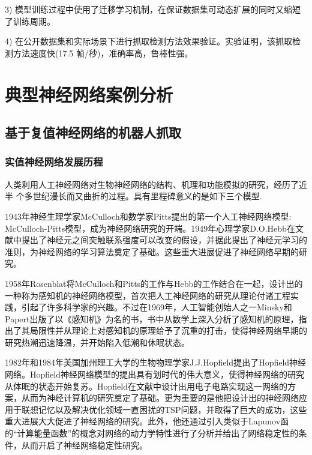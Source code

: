\documentclass[no-math,bwprint]{YangThesis}
\begin{document}
3) 模型训练过程中使用了迁移学习\cite{bibb13}机制，在保证数据集可动态扩展的同时又缩短了训练周期。

4) 在公开数据集和实际场景下进行抓取检测方法效果验证。实验证明，该抓取检测方法速度快(17.5 帧/秒)，准确率高，鲁棒性强。

\newpage
\section{典型神经网络案例分析}

\subsection{基于复值神经网络的机器人抓取}

\subsubsection{实值神经网络发展历程}

人类利用人工神经网络对生物神经网络的结构、机理和功能模拟的研究，经历了近半
个多世纪漫长而又曲折的过程。具有里程碑意义的是如下三个模型\cite{bibc1,bibc2}.

1943年神经生理学家McCulloch和数学家Pitts提出的第一个人工神经网络模型:
McCulloch-Pitts模型\cite{bibc3}，成为神经网络研究的开端。1949年心理学家D.O.Hebb在文献\cite{bibc4}中提出了神经元之间突触联系强度可以改变的假设，并据此提出了神经元学习的准则，为神经网络的学习算法奠定了基础。这些重大进展促进了神经网络早期的研究。

1958年Rosenblat将McCulloch和Pitts的工作与Hebb的工作结合在一起，设计出的
一种称为感知机的神经网络模型\cite{bibc5}，首次把人工神经网络的研究从理论付诸工程实践，引起了许多科学家的兴趣。不过在1969年，人工智能创始人之一Minsky和Papert出版了以《感知机》为名的书\cite{bibc6}，书中从数学上深入分析了感知机的原理，指出了其局限性并从理论上对感知机的原理给予了沉重的打击，使得神经网络早期的研究热潮迅速降温，并开始陷入低潮和休眠状态。

1982年和1984年美国加州理工大学的生物物理学家J.J.Hopfield提出了Hopfield神经
网络\cite{bibc7,bibc8}。Hopfield神经网络模型的提出具有划时代的伟大意义，使得神经网络的研究从体眠的状态开始复苏。Hopfield在文献\cite{bibc7,bibc8}中设计出用电子电路实现这一网络的方案，从而为神经计算机的研究奠定了基础。更为重要的是他把设计出的神经网络应用于联想记忆以及解决优化领域一直困扰的TSP问题，并取得了巨大的成功，这些重大进展大大促进了神经网络的研究。此外，他还通过引入类似于Lapunov函的“计算能量函数”的概念对网络的动力学特性进行了分析并给出了网络稳定性的条件，从而开启了神经网络稳定性研究。
\end{document}
